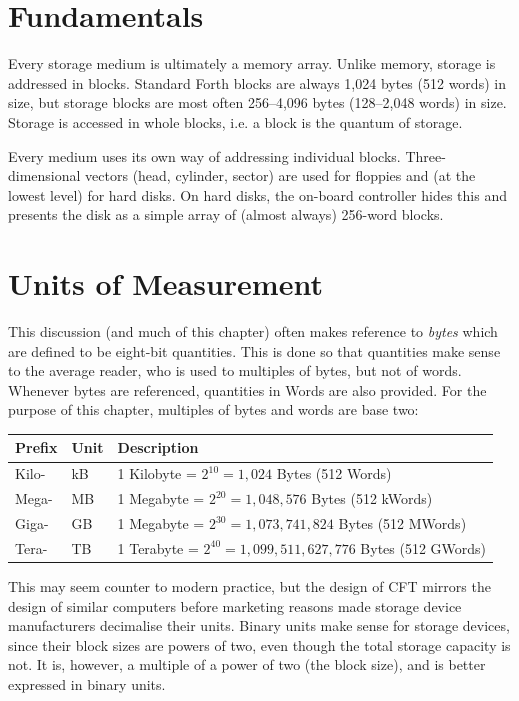 \section{Fundamentals}

Every storage medium is ultimately a memory array. Unlike memory, storage is
addressed in blocks. Standard Forth blocks are always 1,024 bytes (512 words)
in size, but storage blocks are most often 256–4,096 bytes (128–2,048 words) in
size. Storage is accessed in whole blocks, i.e. a block is the quantum of
storage. 

Every medium uses its own way of addressing individual
blocks. Three-dimensional vectors (head, cylinder, sector) are used for
floppies and (at the lowest level) for hard disks. On hard disks, the on-board
controller hides this and presents the disk as a simple array of (almost
always) 256-word blocks.

\section{Units of Measurement}

This discussion (and much of this chapter) often makes reference to
{\em bytes\/} which are defined to be eight-bit quantities. This is
done so that quantities make sense to the average reader, who is used
to multiples of bytes, but not of words. Whenever bytes are
referenced, quantities in Words are also provided. For the purpose of
this chapter, multiples of bytes and words are base two:

\begin{center}
  \zebra
  \begin{tabular}{lll}
    Prefix & Unit    & Description\\\hline
    Kilo-  & kB      & 1 Kilobyte = $2^{10}=1,024$ Bytes (512 Words) \\
    Mega-  & MB      & 1 Megabyte = $2^{20}=1,048,576$ Bytes (512 kWords) \\
    Giga-  & GB      & 1 Megabyte = $2^{30}=1,073,741,824$ Bytes (512 MWords) \\
    Tera-  & TB      & 1 Terabyte = $2^{40}=1,099,511,627,776$ Bytes (512 GWords) \\
    \hline
  \end{tabular}
\end{center}%
%
\noindent This may seem counter to modern practice, but the design of
CFT mirrors the design of similar computers before marketing reasons
made storage device manufacturers decimalise their units. Binary units
make sense for storage devices, since their block sizes are powers of
two, even though the total storage capacity is not. It is, however, a
multiple of a power of two (the block size), and is better expressed
in binary units.

